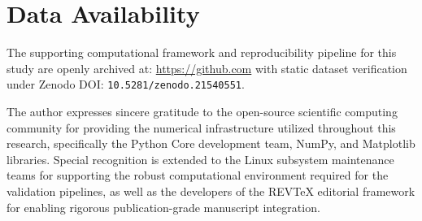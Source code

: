 \documentclass[
  reprint,
  aps,
  prd,
  twocolumn,
  superscriptaddress,
  nofootinbib,
  floatfix
]{revtex4-2}
\begin{document}
\section*{Data Availability}
The supporting computational framework and 
reproducibility pipeline for this study are 
openly archived at: 
\url{https://github.com} 
with static dataset verification under 
Zenodo DOI: \texttt{10.5281/zenodo.21540551}.


\begin{acknowledgments}
The author expresses sincere gratitude to the open-source 
scientific computing community for providing the numerical 
infrastructure utilized throughout this research, specifically 
the Python Core development team, NumPy, and Matplotlib 
libraries. Special recognition is extended to the Linux 
subsystem maintenance teams for supporting the robust 
computational environment required for the validation pipelines, 
as well as the developers of the REVTeX editorial framework 
for enabling rigorous publication-grade manuscript integration.
\end{acknowledgments}
\end{document}
